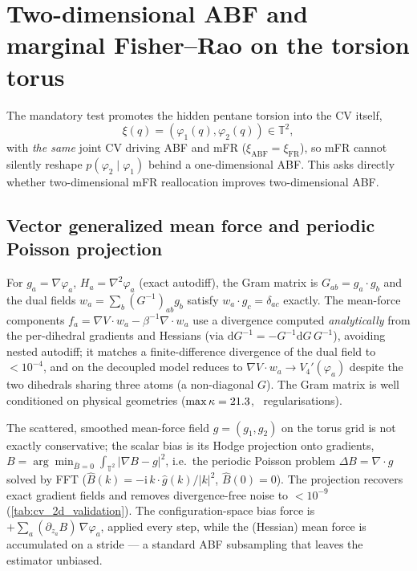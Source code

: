 \section{Two-dimensional ABF and marginal Fisher--Rao on the torsion torus}
\label{sec:cv_2d}

The mandatory test promotes the hidden pentane torsion into the CV itself,
\begin{equation}
  \xi(q) = (\varphi_1(q),\varphi_2(q)) \in \mathbb{T}^2,
\end{equation}
with \emph{the same} joint CV driving ABF and mFR ($\xi_\mathrm{ABF}=\xi_\mathrm{FR}$), so mFR
cannot silently reshape $p(\varphi_2\mid\varphi_1)$ behind a one-dimensional ABF. This asks
directly whether two-dimensional mFR reallocation improves two-dimensional ABF.

\subsection{Vector generalized mean force and periodic Poisson projection}
For $g_a=\nabla\varphi_a$, $H_a=\nabla^2\varphi_a$ (exact autodiff), the Gram matrix is
$G_{ab}=g_a\!\cdot g_b$ and the dual fields $w_a=\sum_b (G^{-1})_{ab}g_b$ satisfy
$w_a\!\cdot g_c=\delta_{ac}$ exactly. The mean-force components
$f_a=\nabla V\!\cdot w_a-\beta^{-1}\nabla\!\cdot w_a$ use a divergence computed
\emph{analytically} from the per-dihedral gradients and Hessians (via
$\mathrm{d}G^{-1}=-G^{-1}\mathrm{d}G\,G^{-1}$), avoiding nested autodiff; it matches a
finite-difference divergence of the dual field to $<10^{-4}$, and on the decoupled model
reduces to $\nabla V\!\cdot w_a\to V_4'(\varphi_a)$ despite the two dihedrals sharing three
atoms (a non-diagonal $G$). The Gram matrix is well conditioned on physical geometries
($\max\kappa=21.3$, \CvGateReg\ regularisations).

The scattered, smoothed mean-force field $g=(g_1,g_2)$ on the torus grid is not exactly
conservative; the scalar bias is its Hodge projection onto gradients,
$B=\arg\min_{\bar B=0}\int_{\mathbb{T}^2}\lvert\nabla B-g\rvert^2$, i.e.\ the periodic Poisson
problem $\Delta B=\nabla\!\cdot g$ solved by FFT
($\hat B(k)=-\mathrm{i}\,k\!\cdot\hat g(k)/\lvert k\rvert^2$, $\hat B(0)=0$). The projection
recovers exact gradient fields and removes divergence-free noise to $<10^{-9}$
(\cref{tab:cv_2d_validation}). The configuration-space bias force is
$+\sum_a (\partial_{z_a}B)\,\nabla\varphi_a$, applied every step, while the (Hessian) mean
force is accumulated on a stride --- a standard ABF subsampling that leaves the estimator
unbiased.

